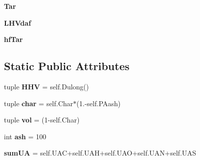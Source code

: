 \begin{DoxyCompactItemize}
\item 
\hypertarget{classCompos__and__Energy_1_1FGDVC__SpeciesBalance_a8ff55e0b4ddd9f051e132a4b969c18b8}{{\bfseries \-Tar}}\label{classCompos__and__Energy_1_1FGDVC__SpeciesBalance_a8ff55e0b4ddd9f051e132a4b969c18b8}

\item 
\hypertarget{classCompos__and__Energy_1_1FGDVC__SpeciesBalance_afd4b8018c475bdcec14c16ddc5ac2811}{{\bfseries \-L\-H\-Vdaf}}\label{classCompos__and__Energy_1_1FGDVC__SpeciesBalance_afd4b8018c475bdcec14c16ddc5ac2811}

\item 
\hypertarget{classCompos__and__Energy_1_1FGDVC__SpeciesBalance_a04c70dda12807ef0b77d49483b4b5b89}{{\bfseries hf\-Tar}}\label{classCompos__and__Energy_1_1FGDVC__SpeciesBalance_a04c70dda12807ef0b77d49483b4b5b89}

\end{DoxyCompactItemize}
\subsection*{\-Static \-Public \-Attributes}
\begin{DoxyCompactItemize}
\item 
\hypertarget{classCompos__and__Energy_1_1FGDVC__SpeciesBalance_a4696829d0164bb40c9e5205334c46e86}{tuple {\bfseries \-H\-H\-V} = self.\-Dulong()}\label{classCompos__and__Energy_1_1FGDVC__SpeciesBalance_a4696829d0164bb40c9e5205334c46e86}

\item 
\hypertarget{classCompos__and__Energy_1_1FGDVC__SpeciesBalance_a4294e22b98d0497a9d89ea5cc6cbeec9}{tuple {\bfseries char} = self.\-Char$\ast$(1.-\/self.\-P\-Aash)}\label{classCompos__and__Energy_1_1FGDVC__SpeciesBalance_a4294e22b98d0497a9d89ea5cc6cbeec9}

\item 
\hypertarget{classCompos__and__Energy_1_1FGDVC__SpeciesBalance_aa84a0a8f02f9f30916cbabfe7cee3409}{tuple {\bfseries vol} = (1-\/self.\-Char)}\label{classCompos__and__Energy_1_1FGDVC__SpeciesBalance_aa84a0a8f02f9f30916cbabfe7cee3409}

\item 
\hypertarget{classCompos__and__Energy_1_1FGDVC__SpeciesBalance_a72b68b3215acc14ce6e995208dc7b4c1}{int {\bfseries ash} = 100}\label{classCompos__and__Energy_1_1FGDVC__SpeciesBalance_a72b68b3215acc14ce6e995208dc7b4c1}

\item 
\hypertarget{classCompos__and__Energy_1_1SpeciesBalance_a57d64961c8e035bf8087528adf669379}{{\bfseries sum\-U\-A} = self.\-U\-A\-C+self.\-U\-A\-H+self.\-U\-A\-O+self.\-U\-A\-N+self.\-U\-A\-S}\label{classCompos__and__Energy_1_1SpeciesBalance_a57d64961c8e035bf8087528adf669379}

\end{DoxyCompactItemize}


